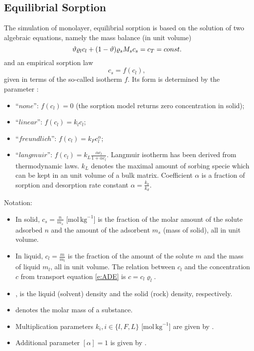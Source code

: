 \subsection{Equilibrial Sorption}
\label{sec:sorp_math}

The simulation of monolayer, equilibrial sorption is based on the solution of two algebraic equations, namely the mass balance (in unit volume)
\begin{equation}
\label{eq:mass_balance_sorption}
\th \varrho_l c_l + (1-\th) \varrho_s M_s c_s = c_T = const.
\end{equation}
and an empirical sorption law
\begin{equation}
\label{eq:relation_cs_cl}
c_s = f(c_l),
\end{equation}
given in terms of the so-called isotherm $f$.
Its form is determined by the parameter :
\begin{itemize}
 \item ``$none$'': $f(c_l)=0$ (the sorption model returns zero concentration in solid);
 \item ``$linear$'': $f(c_l) = k_l c_l$;
 \item ``$freundlich$'': $f(c_l) = k_F c_l^{\alpha}$;
 \item ``$langmuir$'': $f(c_l) = k_L \frac{\alpha c_l}{1 + \alpha c_l}$.
       Langmuir isotherm has been derived from thermodynamic laws. $k_L$ denotes the maximal amount 
       of sorbing specie which can be kept in an unit volume of a bulk matrix. Coefficient $\alpha$ is 
       a fraction of sorption and desorption rate constant $\alpha = \frac{k_a}{k_d}$.
\end{itemize}

Notation:
\begin{itemize}
 \item In solid, $c_s = \frac{n}{m_s}$ [mol\,$\mathrm{kg}^{-1}$] is the fraction of the molar amount of the solute 
       adsorbed $n$ and the amount of the adsorbent $m_s$ (mass of solid), all in unit volume.
 \item In liquid, $c_l = \frac{m}{m_l}$ \units{}{}{} is the fraction of the amount of the solute $m$ and 
       the mass of liquid $m_l$, all in unit volume. The relation between $c_l$ and the concentration $c$ from 
       transport equation \eqref{e:ADE} is $c = c_l \varrho_l$.
 \item {},  is the liquid (solvent) density and the solid (rock) density, respectively.
 \item {} denotes the molar mass of a substance.
 \item Multiplication parameters $k_i, i\in\{ l,F,L\}$ [mol\,$\mathrm{kg}^{-1}$] are given by 
       .
 \item Additional parameter $[\alpha] = 1$ is given by .
\end{itemize}

